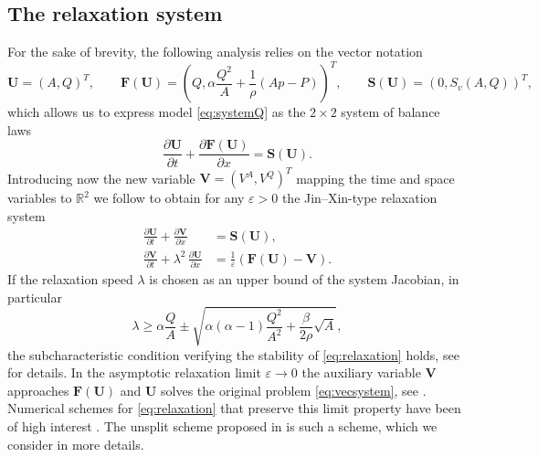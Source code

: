 \documentclass[a4paper,11pt]{article}
\newcommand{\R}{\mathbb{R}}
\begin{document}
\subsection{The relaxation system}
For the sake of brevity, the following analysis relies on the vector notation 
\begin{equation}\label{eq:systemQvector}
  \mathbf U = (A, Q)^T, \qquad \mathbf F(\mathbf U) = \left(Q, \alpha \frac{Q^2}{A} + \frac{1}{\rho} \left(Ap - P \right)\right)^T, \qquad \mathbf S(\mathbf U) = (0, S_v(A, Q))^T,
\end{equation}
which allows us to express model \eqref{eq:systemQ} as the $2 \times 2$ system of balance laws
\begin{equation}\label{eq:vecsystem}
\frac{\partial \mathbf U}{\partial t} + \frac{\partial \mathbf F(\mathbf U)}{\partial x} = \mathbf S(\mathbf U).
\end{equation}
Introducing now the new variable $\mathbf V = (V^A, V^Q)^T$ mapping the time and space variables to $\R^2$ we follow \cite{jin1995relaxschemsystem} to obtain for any $\varepsilon>0$ the Jin--Xin-type relaxation system
\begin{equation}\label{eq:relaxation}
  \begin{aligned}
    \frac{\partial \mathbf U}{\partial t} + \frac{\partial  \mathbf V}{\partial x} &= \mathbf S(\mathbf U), \\
   \frac{ \partial \mathbf V}{\partial t} + \lambda^2 \, \frac{ \partial \mathbf U}{\partial x} &= \frac{1}{\varepsilon}(\mathbf F(\mathbf U) - \mathbf V).
\end{aligned}
\end{equation}
If the relaxation speed $\lambda$ is chosen as an upper bound of the system Jacobian, in particular
\begin{equation}\label{eq:lambdastability}
\lambda \geq \alpha \frac{Q}{A} \pm \sqrt{\alpha(\alpha - 1) \frac{Q^2}{A^2} + \frac{\beta}{2 \rho} \sqrt{A}},
\end{equation}
the subcharacteristic condition verifying the stability of \eqref{eq:relaxation} holds, see \cite{liu1987hyperconserlawsrelax} for details. In the asymptotic relaxation limit $\varepsilon \to 0$ the auxiliary variable $\mathbf V$ approaches $\mathbf F (\mathbf U)$ and $\mathbf U$ solves the original problem \eqref{eq:vecsystem}, see \cite{chen1994hyperconserlaws}. Numerical schemes for \eqref{eq:relaxation} that preserve this limit property have been of high interest \cite{hu2017asymppreserschem}. The unsplit scheme proposed in \cite{jin2012asympap} is such a scheme, which we consider in more details.
\end{document}
